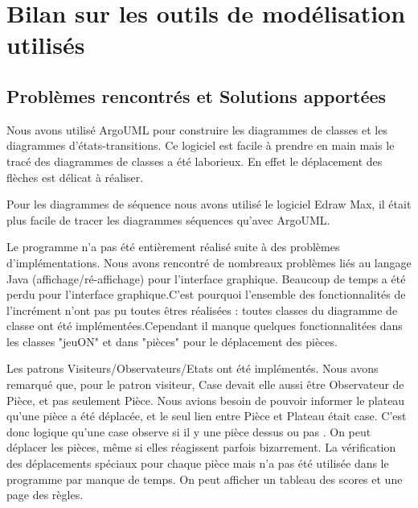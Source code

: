 \documentclass[11pt,a4paper]{report}
\begin{document}
\maketitle
\chapter*{Bilan sur les outils de modélisation utilisés}

\section*{Problèmes rencontrés et Solutions apportées}
Nous avons utilisé ArgoUML pour construire les diagrammes de classes et les diagrammes d'états-transitions. 
Ce logiciel est facile à prendre en main mais le tracé des diagrammes de classes a été laborieux. 
En effet le déplacement des flèches est délicat à réaliser.

Pour les diagrammes de séquence nous avons utilisé le logiciel Edraw Max, il était plus facile de tracer les diagrammes séquences qu'avec ArgoUML.

Le programme n'a pas été entièrement réalisé suite à des problèmes d'implémentations. Nous avons rencontré de nombreaux problèmes liés
au langage Java (affichage/ré-affichage) pour l'interface graphique. Beaucoup de temps a été perdu pour l'interface
graphique.C'est pourquoi l'ensemble des fonctionnalités de l'incrément n'ont pas pu toutes êtres réalisées : toutes classes du diagramme de classe ont été implémentées.Cependant il manque quelques fonctionnalitées dans les classes "jeuON" et dans "pièces" pour le déplacement des pièces.

Les patrons Visiteurs/Observateurs/Etats ont été implémentés. Nous avons remarqué que, pour le patron visiteur, Case
devait elle aussi être Observateur de Pièce, et pas seulement Pièce. Nous avions besoin de pouvoir informer le plateau
qu'une pièce a été déplacée, et le seul lien entre Pièce et Plateau était case. C'est donc logique qu'une case
observe si il y une pièce dessus ou pas . On peut déplacer les pièces, même si elles réagissent parfois bizarrement. 
La vérification des déplacements spéciaux pour chaque pièce mais n'a pas été 
utilisée dans le programme par manque de temps.
On peut afficher un tableau des scores et une page des règles.
\end{document}
